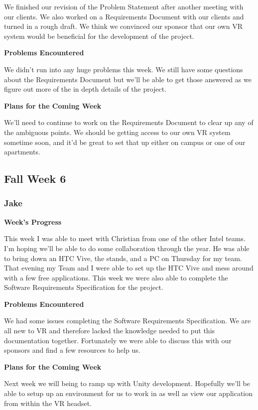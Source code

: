 \documentclass[10pt,journal,compsoc,onecolumn, draftclsnofoot]{IEEEtran}
\begin{document}
We finished our revision of the Problem Statement after another meeting with our clients. We also worked on a Requirements Document with our clients and turned in a rough draft. We think we convinced our sponsor that our own VR system would be beneficial for the development of the project.

\noindent \textbf{Problems Encountered}

We didn't run into any huge problems this week. We still have some questions about the Requirements Document but we'll be able to get those answered as we figure out more of the in depth details of the project.

\noindent \textbf{Plans for the Coming Week}

We'll need to continue to work on the Requirements Document to clear up any of the ambiguous points. We should be getting access to our own VR system sometime soon, and it'd be great to set that up either on campus or one of our apartments.

\subsection{Fall Week 6}
\subsubsection{Jake}
\noindent \textbf{Week's Progress}

This week I was able to meet with Christian from one of the other Intel teams. I'm hoping we'll be able to do some collaboration through the year. He was able to bring down an HTC Vive, the stands, and a PC on Thursday for my team. That evening my Team and I were able to set up the HTC Vive and mess around with a few free applications. This week we were also able to complete the Software Requirements Specification for the project.

\noindent \textbf{Problems Encountered}

We had some issues completing the Software Requirements Specification. We are all new to VR and therefore lacked the knowledge needed to put this documentation together. Fortunately we were able to discuss this with our sponsors and find a few resources to help us.

\noindent \textbf{Plans for the Coming Week}

Next week we will being to ramp up with Unity development. Hopefully we'll be able to setup up an environment for us to work in as well as view our application from within the VR headset.
\end{document}

